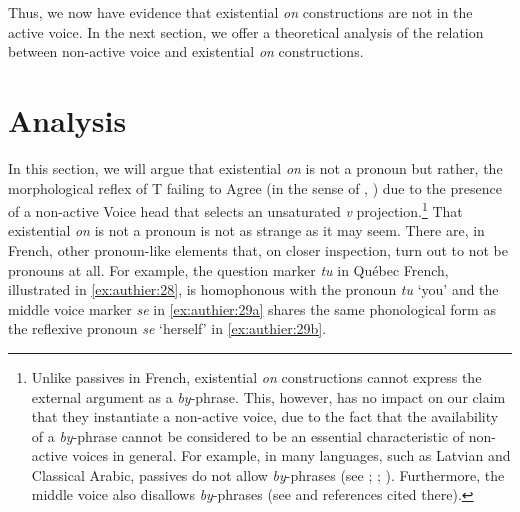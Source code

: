 \documentclass[output=paper,colorlinks,citecolor=brown]{langscibook}
\begin{document}
Thus, we now have evidence that existential \textit{on} constructions are not in the active voice. In the next section, we offer a theoretical analysis of the relation between non-active voice and existential \textit{on} constructions.


\section{Analysis}

In this section, we will argue that existential \textit{on} is not a pronoun but rather, the morphological reflex of T failing to Agree (in the sense of \citealt{preminger2009a}, \citeyear{preminger2014a}) due to the presence of a non-active Voice head that selects an unsaturated \textit{v} projection.\footnote{Unlike passives in French, existential \textit{on} constructions cannot express the external argument as a \textit{by}{}-phrase. This, however, has no impact on our claim that they instantiate a non-active voice, due to the fact that the availability of a \textit{by}{}-phrase cannot be considered to be an essential characteristic of non-active voices in general. For example, in many languages, such as Latvian and Classical Arabic, passives do not allow \textit{by}{}-phrases (see \citet{comrie1977a}; \citet[602]{jaeggli1986a}; \citet[]{siewierska1984a}). Furthermore, the middle voice also disallows \textit{by}{}-phrases (see \citealt{bruening2013a} and references cited there).} That existential \textit{on} is not a pronoun is not as strange as it may seem. There are, in French, other pronoun-like elements that, on closer inspection, turn out to not be pronouns at all. For example, the question marker \textit{tu} in Québec French, illustrated in \ref{ex:authier:28}, is homophonous with the pronoun \textit{tu} ‘you’ and the middle voice marker \textit{se} in \ref{ex:authier:29a} shares the same phonological form as the reflexive pronoun \textit{se} ‘herself’ in \ref{ex:authier:29b}. 

\begin{exe}
\ex\label{ex:authier:28} 
\begin{xlist} %
\end{xlist}
\end{exe}
\end{document}
